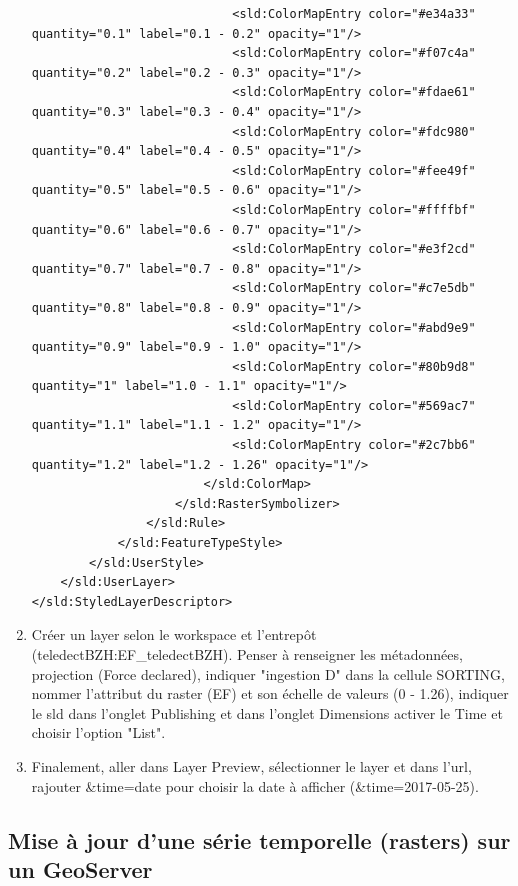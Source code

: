 \documentclass[10pt,a4paper]{article}
\begin{document}
\begin{enumerate}
\begin{verbatim}
                            <sld:ColorMapEntry color="#e34a33" quantity="0.1" label="0.1 - 0.2" opacity="1"/>
                            <sld:ColorMapEntry color="#f07c4a" quantity="0.2" label="0.2 - 0.3" opacity="1"/>
                            <sld:ColorMapEntry color="#fdae61" quantity="0.3" label="0.3 - 0.4" opacity="1"/>
                            <sld:ColorMapEntry color="#fdc980" quantity="0.4" label="0.4 - 0.5" opacity="1"/>
                            <sld:ColorMapEntry color="#fee49f" quantity="0.5" label="0.5 - 0.6" opacity="1"/>
                            <sld:ColorMapEntry color="#ffffbf" quantity="0.6" label="0.6 - 0.7" opacity="1"/>
                            <sld:ColorMapEntry color="#e3f2cd" quantity="0.7" label="0.7 - 0.8" opacity="1"/>
                            <sld:ColorMapEntry color="#c7e5db" quantity="0.8" label="0.8 - 0.9" opacity="1"/>
                            <sld:ColorMapEntry color="#abd9e9" quantity="0.9" label="0.9 - 1.0" opacity="1"/>
                            <sld:ColorMapEntry color="#80b9d8" quantity="1" label="1.0 - 1.1" opacity="1"/>
                            <sld:ColorMapEntry color="#569ac7" quantity="1.1" label="1.1 - 1.2" opacity="1"/>
                            <sld:ColorMapEntry color="#2c7bb6" quantity="1.2" label="1.2 - 1.26" opacity="1"/>
                        </sld:ColorMap>
                    </sld:RasterSymbolizer>
                </sld:Rule>
            </sld:FeatureTypeStyle>
        </sld:UserStyle>
    </sld:UserLayer>
</sld:StyledLayerDescriptor>
\end{verbatim}
\item Créer un layer selon le workspace et l'entrepôt (teledectBZH:EF\_teledectBZH). Penser à renseigner les métadonnées, projection (Force declared), indiquer "ingestion D" dans la cellule SORTING, nommer l'attribut du raster (EF) et son échelle de valeurs (0 - 1.26), indiquer le sld dans l'onglet Publishing et dans l'onglet Dimensions activer le Time et choisir l'option "List".
\item Finalement, aller dans Layer Preview, sélectionner le layer et dans l'url, rajouter \&time=date pour choisir la date à afficher (\&time=2017-05-25).
\end{enumerate}

\subsection{Mise à jour d'une série temporelle (rasters) sur un GeoServer}
\end{document}
